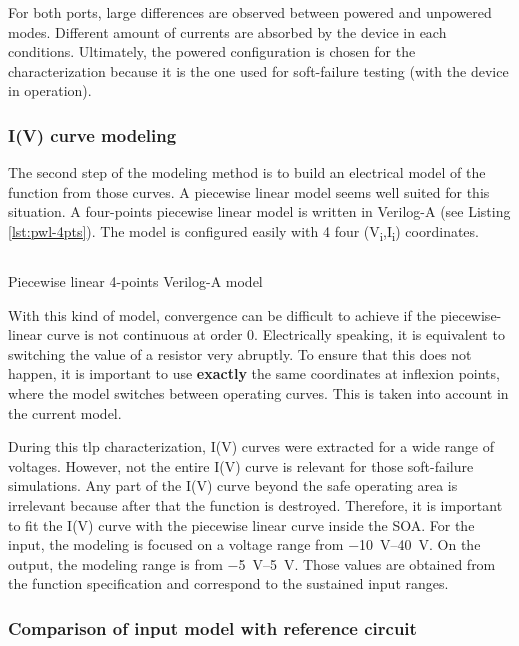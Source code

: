 For both ports, large differences are observed between powered and unpowered modes.
Different amount of currents are absorbed by the device in each conditions.
Ultimately, the powered configuration is chosen for the characterization because it is the one used for soft-failure testing (with the device in operation).

\subsubsection{I(V) curve modeling}

The second step of the modeling method is to build an electrical model of the function from those curves.
A piecewise linear model seems well suited for this situation.
A four-points piecewise linear model is written in Verilog-A (see Listing \ref{lst:pwl-4pts}).
The model is configured easily with 4 four (V\textsubscript{i},I\textsubscript{i}) coordinates.

\begin{code}
\inputminted[frame=single]{verilog}{src/4/snippets/pwl_4pts.va}
\caption{Piecewise linear 4-points Verilog-A model}
\label{lst:pwl-4pts}
\end{code}

With this kind of model, convergence can be difficult to achieve if the piecewise-linear curve is not continuous at order 0.
Electrically speaking, it is equivalent to switching the value of a resistor very abruptly.
To ensure that this does not happen, it is important to use \textbf{exactly} the same coordinates at inflexion points, where the model switches between operating curves.
This is taken into account in the current model.

During this \gls{tlp} characterization, I(V) curves were extracted for a wide range of voltages.
However, not the entire I(V) curve is relevant for those soft-failure simulations.
Any part of the I(V) curve beyond the safe operating area is irrelevant because after that the function is destroyed.
Therefore, it is important to fit the I(V) curve with the piecewise linear curve inside the SOA.
For the input, the modeling is focused on a voltage range from \SIrange{-10}{40}{\volt}.
On the output, the modeling range is from \SIrange{-5}{5}{\volt}.
Those values are obtained from the function specification and correspond to the sustained input ranges.

\subsubsection{Comparison of input model with reference circuit}

